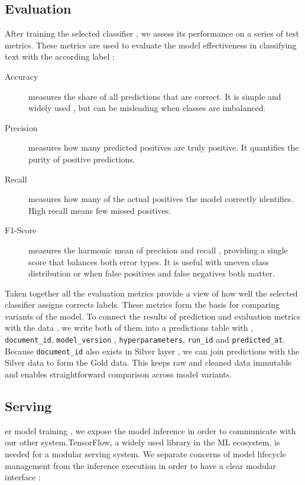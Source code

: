 \subsection{Evaluation}
After training the selected classifier , we assess its performance on a series of test metrics. These metrics are used to evaluate the model effectiveness in classifying text with the according label \cite{allam:2024} :

\begin{description}
  \item[Accuracy] measures the share of all predictions that are correct. It is simple and widely used , but can be misleading when classes are imbalanced.
  \item[Precision] measures how many predicted positives are truly positive. It quantifies the purity of positive predictions.
  \item[Recall] measures how many of the actual positives the model correctly identifies. High recall means few missed positives.
  \item[F1-Score] measures the harmonic mean of precision and recall , providing a single score that balances both error types. It is useful with uneven class distribution or when false positives and false negatives both matter.
\end{description}

Taken together all the evaluation metrics provide a view of how well the selected classifier assigns corrects labels. These metrics form the basis for comparing variants of the model.
To connect the results of prediction and evaluation metrics with the data , we write both of them into a predictions table with , \texttt{document\_id}, \texttt{model\_version} , \texttt{hyperparameters}, \texttt{run\_id} and \texttt{predicted\_at}. Because \texttt{document\_id} also exists in Silver layer , we can join predictions with the Silver data to form the Gold data. This keeps raw and cleaned data immutable and enables straightforward comparison across model variants.


\subsection{Serving}
er model training , we expose the model inference in order to communicate with our other system.TensorFlow, a widely used library in the ML ecosystem, is needed for a modular serving system. We separate concerns of  model lifecycle management from the inference execution in order to have a clear modular interface \cite{ilemobayo:20243}:


